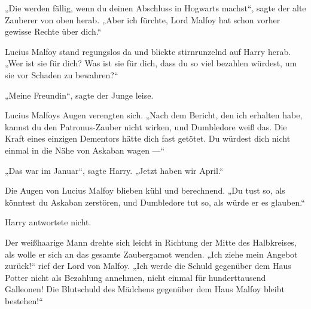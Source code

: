 „Die werden fällig, wenn du deinen Abschluss in Hogwarts machst“, sagte der alte Zauberer von oben herab.
„Aber ich fürchte, Lord Malfoy hat schon vorher gewisse Rechte über dich.“

Lucius Malfoy stand regungslos da und blickte stirnrunzelnd auf Harry herab.
„Wer ist sie für dich? Was ist sie für dich, dass du so viel bezahlen würdest, um sie vor Schaden zu bewahren?“

„Meine Freundin“, sagte der Junge leise.

Lucius Malfoys Augen verengten sich.
„Nach dem Bericht, den ich erhalten habe, kannst du den Patronus-Zauber nicht wirken, und Dumbledore weiß das. Die Kraft eines einzigen Dementors hätte dich fast getötet. Du würdest dich nicht einmal in die Nähe von Askaban wagen —“

„Das war im Januar“, sagte Harry.
„Jetzt haben wir April.“

Die Augen von Lucius Malfoy blieben kühl und berechnend.
„Du tust so, als könntest du Askaban zerstören, und Dumbledore tut so, als würde er es glauben.“

Harry antwortete nicht.

Der weißhaarige Mann drehte sich leicht in Richtung der Mitte des Halbkreises, als wolle er sich an das gesamte Zaubergamot wenden.
„Ich ziehe mein Angebot zurück!“ rief der Lord von Malfoy.
„Ich werde die Schuld gegenüber dem Haus Potter nicht als Bezahlung annehmen, nicht einmal für hunderttausend Galleonen! Die Blutschuld des Mädchens gegenüber dem Haus Malfoy bleibt bestehen!“

